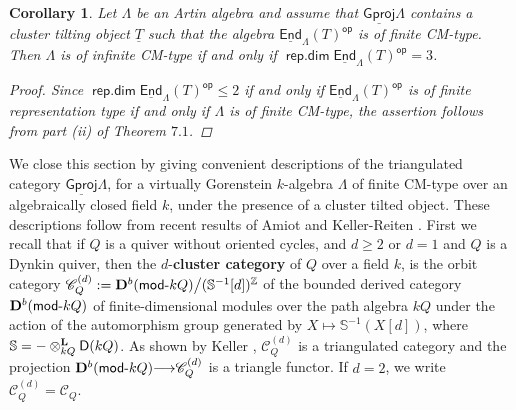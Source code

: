 \documentclass[oneside, a4paper,reqno]{amsart}
\numberwithin{equation}{section}
\newtheorem{cor}[thm]{Corollary}
\theoremstyle{definition}
\begin{document}
\begin{cor} Let $\Lambda$ be an Artin algebra and assume that ${\operatorname{\underline{\mathsf{Gproj}}}\nolimits}\Lambda$ contains a cluster tilting object $\underline{T}$ such that the algebra $\operatorname*{\underline{\mathsf{End}}}_{\Lambda}(T)^\operatorname*{\mathsf{op}}$ is of finite CM-type. Then $\Lambda$ is of infinite CM-type if and only if $\operatorname*{\mathsf{rep.dim}}\operatorname*{\underline{\mathsf{End}}}_{\Lambda}(T)^\operatorname*{\mathsf{op}} = 3$.
\begin{proof} Since $\operatorname*{\mathsf{rep.dim}}\operatorname*{\underline{\mathsf{End}}}_{\Lambda}(T)^\operatorname*{\mathsf{op}}\leq 2$ if and only if
$\operatorname*{\underline{\mathsf{End}}}_{\Lambda}(T)^\operatorname*{\mathsf{op}}$ is of finite representation type if and
only if $\Lambda$ is of finite CM-type, the assertion follows from part (ii) of Theorem $7.1$.
\end{proof}
\end{cor}

We close this section by giving convenient descriptions of the
triangulated category ${\operatorname{\underline{\mathsf{Gproj}}}\nolimits}\Lambda$, for a virtually Gorenstein
$k$-algebra $\Lambda$ of finite CM-type over an algebraically closed
field $k$, under the presence of a cluster tilted object. These
descriptions follow from recent results of Amiot \cite{Amiot} and
Keller-Reiten \cite{KR:acyclic}. First we recall that if $Q$ is a
quiver without oriented cycles, and $d \geq 2$ or $d = 1$ and $Q$ is
a Dynkin quiver, then the $d$-{\bf cluster category} of $Q$ over a
field $k$, is the orbit category ${\mathscr C}^{(d)}_{Q} := {\bf D}^{b}(\operatorname*{\mathsf{mod}-\!}
kQ)\big/ (\mathbb S^{-1}[d])^{\mathbb Z}$ of the bounded derived
category  ${\bf D}^{b}(\operatorname*{\mathsf{mod}-\!}
kQ)$ of finite-dimensional modules over the path algebra $kQ$
under the action of the automorphism group generated by $X \mapsto
\mathbb S^{-1}(X[d])$, where $\mathbb S = -\otimes^{\bf L}_{kQ}\mathsf{D}(kQ)$.  As shown by Keller \cite{Keller:orbit},
${\mathscr C}^{(d)}_{Q}$ is a triangulated category and the projection ${\bf
D}^{b}(\operatorname*{\mathsf{mod}-\!} kQ) {\longrightarrow} {\mathscr C}^{(d)}_{Q}$ is a triangle functor. If $d =
2$, we write ${\mathscr C}^{(d)}_{Q} = {\mathscr C}_{Q}$.
\end{document}
